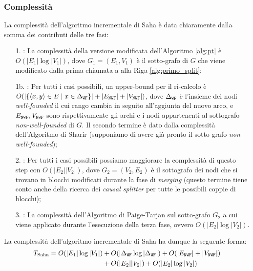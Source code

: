 \subsubsection{Complessità}
\label{sec:saha_complexity}
La complessità dell'algoritmo incrementale di Saha è data chiaramente dalla somma dei contributi delle tre fasi:
\begin{enumerate}
    \item[1.] \splitfunc: La complessità della versione modificata dell'Algoritmo \ref{alg:pt} è $O(|E_1|\log |V_1|)$, dove $G_1=(E_1, V_1)$ è il sotto-grafo di $G$ che viene modificato dalla prima chiamata a \splitfunc alla Riga \ref{alg:primo_split};
    \item[1b.] \rankfunc: Per tutti i casi possibili, un upper-bound per il ri-calcolo è $O(|\{\langle x,y\rangle \in E \mid x \in \Delta_{\texttt{\textup{WF}}}\}| + |E_{\texttt{\textup{NWF}}}| + |V_{\texttt{\textup{NWF}}}|)$, dove $\Delta_{\texttt{\textup{WF}}}$ è l'insieme dei nodi \emph{well-founded} il cui rango cambia in seguito all'aggiunta del nuovo arco, e $E_{\texttt{\textup{NWF}}}, V_{\texttt{\textup{NWF}}}$ sono rispettivamente gli archi e i nodi appartenenti al sottografo \emph{non-well-founded} di $G$. Il secondo termine è dato dalla complessità dell'Algoritmo di Sharir \cite{sharir} (supponiamo di avere già pronto il sotto-grafo \emph{non-well-founded});
    \item[2.] : Per tutti i casi possibili possiamo maggiorare la complessità di questo step con $O(|E_2||V_2|)$, dove $G_2=(V_2,E_2)$ è il sottografo dei nodi che si trovano in blocchi modificati durante la fase di \emph{merging} (questo termine tiene conto anche della ricerca dei \emph{causal splitter} per tutte le possibili coppie di blocchi);
    \item[3.] \splitfunc: La complessità dell'Algoritmo di Paige-Tarjan sul sotto-grafo $G_2$ a cui viene applicato durante l'esecuzione della terza fase, ovvero $O(|E_2| \log |V_2|)$.
\end{enumerate}
La complessità dell'algoritmo incrementale di Saha ha dunque la seguente forma:
\begin{align*}
    T_{\text{Saha}} = O(|E_1|\log|V_1|) &+ O(|\Delta_{\texttt{\textup{WF}}}\log|\Delta_{\texttt{\textup{WF}}}|) + O(|E_{\texttt{\textup{NWF}}}| + |V_{\texttt{\textup{NWF}}}|)\\
    &+ O(|E_2||V_2|) + O(|E_2|\log|V_2|)
\end{align*}

